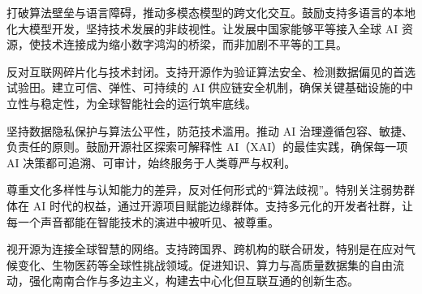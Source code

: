 打破算法壁垒与语言障碍，推动多模态模型的跨文化交互。鼓励支持多语言的本地化大模型开发，坚持技术发展的非歧视性。让发展中国家能够平等接入全球 AI 资源，使技术连接成为缩小数字鸿沟的桥梁，而非加剧不平等的工具。

反对互联网碎片化与技术封闭。支持开源作为验证算法安全、检测数据偏见的首选试验田。建立可信、弹性、可持续的 AI 供应链安全机制，确保关键基础设施的中立性与稳定性，为全球智能社会的运行筑牢底线。

坚持数据隐私保护与算法公平性，防范技术滥用。推动 AI 治理遵循包容、敏捷、负责任的原则。鼓励开源社区探索可解释性 AI（XAI）的最佳实践，确保每一项 AI 决策都可追溯、可审计，始终服务于人类尊严与权利。

尊重文化多样性与认知能力的差异，反对任何形式的“算法歧视”。特别关注弱势群体在 AI 时代的权益，通过开源项目赋能边缘群体。支持多元化的开发者社群，让每一个声音都能在智能技术的演进中被听见、被尊重。

视开源为连接全球智慧的网络。支持跨国界、跨机构的联合研发，特别是在应对气候变化、生物医药等全球性挑战领域。促进知识、算力与高质量数据集的自由流动，强化南南合作与多边主义，构建去中心化但互联互通的创新生态。
